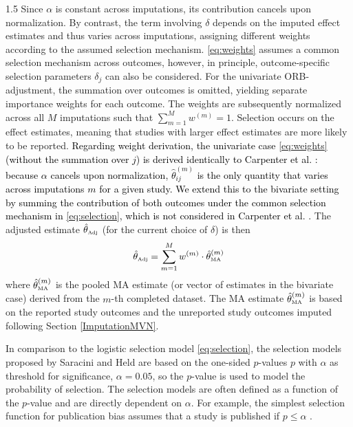 \documentclass{article}
\newcommand{\mycolor}[1]{\textcolor{black}{#1}}
\begin{document}
\begin{spacing}{1.5}
{Since $\alpha$ is constant across imputations, its contribution cancels upon normalization. By contrast, the term involving $\delta$ depends on the imputed effect estimates and thus varies across imputations, assigning different weights according to the assumed selection mechanism.} \eqref{eq:weights} assumes a common selection mechanism across outcomes, however, in principle, outcome-specific selection parameters $\delta_j$ can also be considered. For the univariate ORB-adjustment, the summation over outcomes is omitted, yielding separate importance weights for each outcome. The weights are subsequently normalized across all $M$ imputations such that $\sum_{m=1}^{M} w^{(m)} = 1$. Selection occurs on the effect estimates, meaning that studies with larger effect estimates are more likely to be reported. 
\mycolor{Regarding weight derivation, the univariate case \eqref{eq:weights} (without the summation over $j$) is derived identically to Carpenter et al. \cite[web appendix]{carpenter2011assessing}: because 
$\alpha$ cancels upon normalization, $\hat\theta_{ij}^{(m)}$ is the only quantity that varies across imputations $m$ for a given study. We extend this to the bivariate setting by summing the contribution of both outcomes under the common selection mechanism in \eqref{eq:selection}, which is not considered in Carpenter et al. \cite{carpenter2011assessing}.} The adjusted estimate $\hat\theta_{\tiny{\mbox{Adj}}}$ (for the current choice of $\delta$) is then 
\begin{equation} \label{eq:weightedAverage}
\hat\theta_{\tiny{\mbox{Adj}}} = \sum^{M}_{m = 1} w^{(m)} \cdot \hat\theta^{(m)}_{\tiny{\mbox{MA}}} 
\end{equation}
where $\hat\theta^{(m)}_{\tiny{\mbox{MA}}}$ is the pooled MA estimate (or vector of estimates in the bivariate case) derived from the $m$-th completed dataset. The MA estimate $\hat\theta^{(m)}_{\tiny{\mbox{MA}}}$ is based on the reported study outcomes and the unreported study outcomes imputed following Section \ref{ImputationMVN}. 

In comparison to the logistic selection model \eqref{eq:selection}, the selection models proposed by Saracini and Held \cite{saracini2025addressing} are based on the one-sided $p$-values $p$ with $\alpha$ as threshold for significance, \eg $\alpha = 0.05$, so the $p$-value is used to model the probability of selection. The selection models are often defined as a function of the $p$-value and are directly dependent on $\alpha$. For example, the simplest selection function for publication bias assumes that a study is published if $p \le \alpha$ \cite{hedges1984estimation, sutton2000modelling}. 


\end{spacing}
\end{document}
